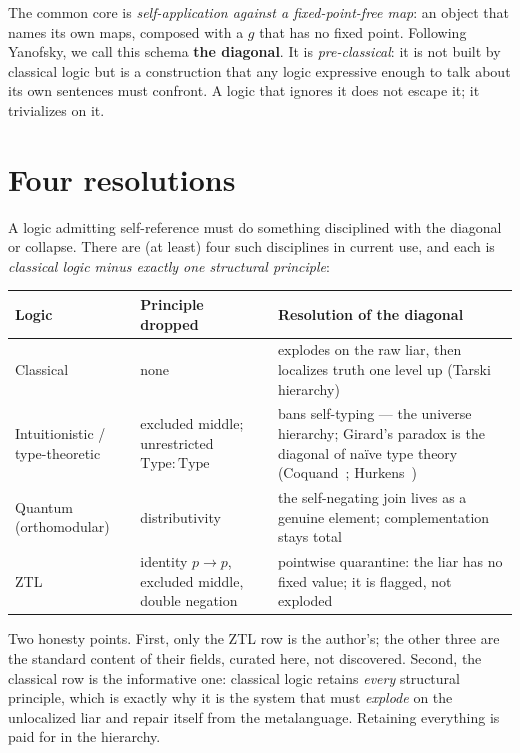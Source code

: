 \documentclass[11pt]{article}
\theoremstyle{remark}
\begin{document}
The common core is \emph{self-application against a fixed-point-free map}: an
object that names its own maps, composed with a $g$ that has no fixed point.
Following Yanofsky, we call this schema \textbf{the diagonal}. It is
\emph{pre-classical}: it is not built by classical logic but is a construction
that any logic expressive enough to talk about its own sentences must
confront. A logic that ignores it does not escape it; it trivializes on it.

\section{Four resolutions}\label{sec:four}

A logic admitting self-reference must do something disciplined with the
diagonal or collapse. There are (at least) four such disciplines in current
use, and each is \emph{classical logic minus exactly one structural
principle}:

\begin{center}
\renewcommand{\arraystretch}{1.3}
\begin{tabular}{@{}>{\raggedright}p{2.6cm}>{\raggedright}p{3.4cm}p{6.4cm}@{}}
\hline
\textbf{Logic} & \textbf{Principle dropped} & \textbf{Resolution of the diagonal} \\
\hline
Classical & none & explodes on the raw liar, then localizes truth one level up (Tarski hierarchy) \\
Intuitionistic / type-theoretic & excluded middle; unrestricted $\mathrm{Type}:\mathrm{Type}$ & bans self-typing --- the universe hierarchy; Girard's paradox is the diagonal of na\"ive type theory (Coquand~\cite{coquand}; Hurkens~\cite{hurkens}) \\
Quantum (orthomodular) & distributivity & the self-negating join lives as a genuine element; complementation stays total \\
ZTL & identity $p\to p$, excluded middle, double negation & pointwise quarantine: the liar has no fixed value; it is flagged, not exploded~\cite{ztl} \\
\hline
\end{tabular}
\end{center}

Two honesty points. First, only the ZTL row is the author's; the other three
are the standard content of their fields, curated here, not discovered.
Second, the classical row is the informative one: classical logic retains
\emph{every} structural principle, which is exactly why it is the system that
must \emph{explode} on the unlocalized liar and repair itself from the
metalanguage. Retaining everything is paid for in the hierarchy.
\end{document}

